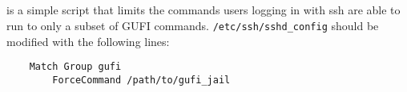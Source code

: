 \subsection{\gufijail}
\label{sec:gufi_jail}
\gufijail is a simple script that limits the commands users logging in
with ssh are able to run to only a subset of GUFI
commands. \texttt{/etc/ssh/sshd\_config} should be modified with the
following lines:

\begin{verbatim}
    Match Group gufi
        ForceCommand /path/to/gufi_jail
\end{verbatim}
